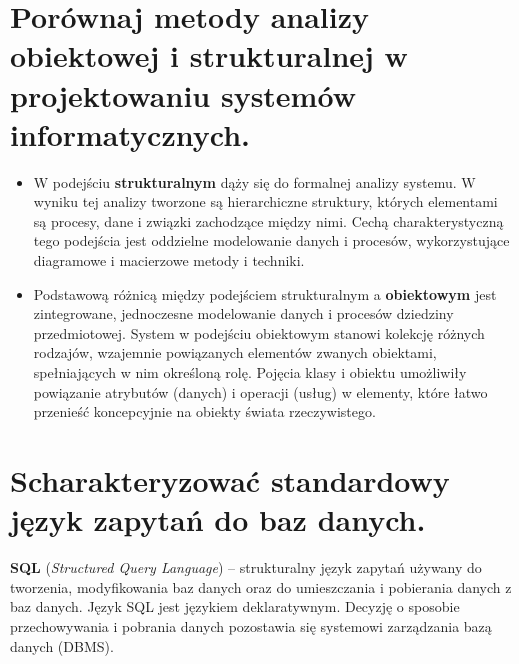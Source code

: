\documentclass[12pt,a4paper]{article}
\begin{document}
	\section{Porównaj metody analizy obiektowej i strukturalnej w projektowaniu systemów informatycznych.}
	\begin{itemize}
		\item W podejściu \textbf{strukturalnym} dąży się do formalnej analizy systemu. W wyniku tej analizy tworzone są hierarchiczne struktury, których elementami są procesy, dane i związki zachodzące między nimi. Cechą charakterystyczną tego podejścia jest oddzielne modelowanie danych i procesów, wykorzystujące diagramowe i macierzowe metody i techniki.
		\item Podstawową różnicą między podejściem strukturalnym a \textbf{obiektowym} jest zintegrowane, jednoczesne modelowanie danych i procesów dziedziny przedmiotowej. System w podejściu obiektowym stanowi kolekcję różnych rodzajów, wzajemnie powiązanych elementów zwanych obiektami, spełniających w nim określoną rolę. Pojęcia klasy i obiektu umożliwiły powiązanie atrybutów (danych) i operacji (usług) w elementy, które łatwo przenieść koncepcyjnie na obiekty świata rzeczywistego.
	\end{itemize}

	\section{Scharakteryzować standardowy język zapytań do baz danych.}
	\textbf{SQL} (\textit{Structured Query Language}) – strukturalny język zapytań używany do tworzenia, modyfikowania baz danych oraz do umieszczania i pobierania danych z baz danych. Język SQL jest językiem deklaratywnym. Decyzję o sposobie przechowywania i pobrania danych pozostawia się systemowi zarządzania bazą danych (DBMS).\\
\end{document}
